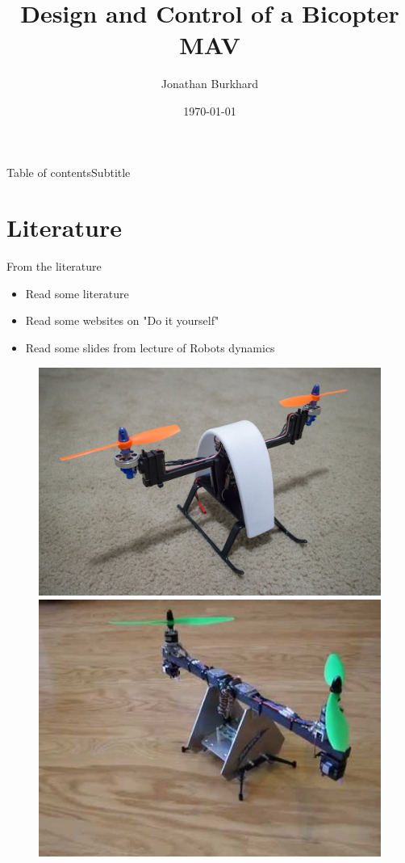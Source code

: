 \documentclass{beamer}
\author{Jonathan Burkhard}
\title{Design and Control of a Bicopter MAV}
\date{\today}
\begin{document}
\frame{\maketitle}
\begin{frame}{Table of contents}{Subtitle}
	\tableofcontents
\end{frame}

\section{Literature}
\begin{frame}{From the literature}
\begin{itemize}
\item Read some literature 
\item Read some websites on "Do it yourself"
\item Read some slides from lecture of Robots dynamics
\end{itemize}
\begin{figure}
\includegraphics[scale=0.1]{pictures/bicopter}
\includegraphics[scale=0.2]{pictures/bicopter2}

\end{figure}
\end{frame}
\end{document}
